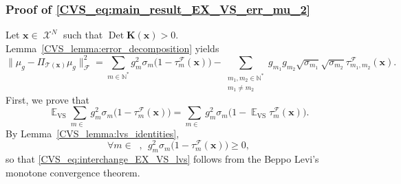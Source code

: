 \documentclass[twoside,11pt]{book}
\numberwithin{theorem}{chapter}
\numberwithin{definition}{chapter}
\numberwithin{proposition}{chapter}
\numberwithin{corollary}{chapter}
\numberwithin{example}{chapter}
\numberwithin{lemma}{chapter}
\numberwithin{assumption}{chapter}
\DeclareMathOperator{\Det}{Det}
\DeclareMathOperator{\VS}{\mathrm{VS}}
\DeclareMathOperator{\EX}{\mathbb{E}}
\DeclareMathOperator{\F}{\mathcal{F}}
\DeclareMathOperator{\X}{\mathcal{X}}
\DeclareMathOperator{\Ns}{\mathbb{N}^{*}}
\newcommand{\rb}[1]{\textcolor{magenta}{#1}}
\begin{document}
\subsubsection{Proof of \eqref{CVS_eq:main_result_EX_VS_err_mu_2}}
Let $\bm{x} \in \X^{N}$ such that $\Det \bm{K}(\bm{x}) >0 $. Lemma~\ref{CVS_lemma:error_decomposition} yields
\begin{equation}
\|\mu_{g} - \Pi_{\mathcal{T}(\bm{x})} \mu_{g}\|_{\F}^{2}  = \sum\limits_{m \in \mathbb{N}^{*}} g_{m}^{2} \sigma_{m}\bigg(1- \tau_{m}^{\F}(\bm{x})\bigg) - \sum\limits_{\substack{m_{1},m_{2} \in \mathbb{N}^{*} \\ m_{1} \neq m_{2}}}  g_{m_{1}}g_{m_{2}} \sqrt{\sigma_{m_{1}}} \sqrt{\sigma_{m_{2}}} \tau_{m_{1},m_{2}}^{\F}(\bm{x}).
\end{equation}
First, we prove that
\begin{equation}\label{CVS_eq:interchange_EX_VS_lvs}
\EX_{\VS} \sum\limits_{m \in \Ns} g_{m}^{2} \sigma_{m}\bigg(1- \tau_{m}^{\F}(\bm{x})\bigg) = \sum\limits_{m \in \Ns} g_{m}^{2} \sigma_{m}\bigg(1- \EX_{\VS}\tau_{m}^{\F}(\bm{x})\bigg).
\end{equation}
By Lemma~\ref{CVS_lemma:lvs_identities},
\begin{equation}
\forall m \in \Ns, \:\: g_{m}^{2} \sigma_{m}\bigg(1- \tau_{m}^{\F}(\bm{x})\bigg)\geq 0, \label{CVS_e:summable_term}
\end{equation}
so that \eqref{CVS_eq:interchange_EX_VS_lvs} follows from the Beppo Levi's monotone convergence theorem.
\end{document}

